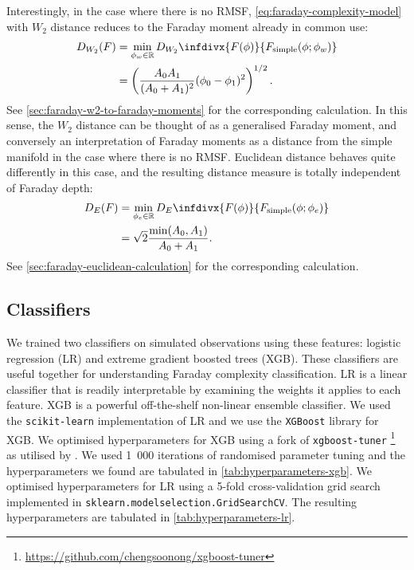     Interestingly, in the case where there is no RMSF, \autoref{eq:faraday-complexity-model} with $W_2$ distance reduces to the Faraday moment already in common use:
    \begin{align}
        D_{W_2}(F) &= \min_{\phi_w \in \mathbb{R}} D_{W_2}\infdivx{F(\phi)}{F_{\mathrm{simple}}(\phi; \phi_w)}\label{eq:faraday-W2-distance}\\
            &= \left(\frac{A_0A_1}{(A_0 + A_1)^2} (\phi_0 - \phi_1)^2\right)^{1/2}.
    \end{align}
    See \autoref{sec:faraday-w2-to-faraday-moments} for the corresponding calculation. In this sense, the $W_2$ distance can be thought of as a generalised Faraday moment, and conversely an interpretation of Faraday moments as a distance from the simple manifold in the case where there is no RMSF. Euclidean distance behaves quite differently in this case, and the resulting distance measure is totally independent of Faraday depth:
    \begin{align}
        D_{E}(F) &= \min_{\phi_e \in \mathbb{R}} D_E\infdivx{F(\phi)}{F_{\mathrm{simple}}(\phi; \phi_e)}\label{eq:faraday-Euclidean-distance}\\
            &= \sqrt{2} \frac{\min(A_0, A_1)}{A_0 + A_1}.
    \end{align}
    See \autoref{sec:faraday-euclidean-calculation} for the corresponding calculation.


  \subsection{Classifiers}
  \label{sec:faraday-classifiers}

    We trained two classifiers on simulated observations using these features: logistic regression (LR) and extreme gradient boosted trees (XGB). These classifiers are useful together for understanding Faraday complexity classification. LR is a linear classifier that is readily interpretable by examining the weights it applies to each feature. XGB is a powerful off-the-shelf non-linear ensemble classifier. We used the \texttt{scikit-learn} implementation of LR and we use the \texttt{XGBoost} library for XGB. We optimised hyperparameters for XGB using a fork of \texttt{xgboost-tuner} \footnote{\url{https://github.com/chengsoonong/xgboost-tuner}} as utilised by \citet{zhu20mutagenic}. We used 1~000 iterations of randomised parameter tuning and the hyperparameters we found are tabulated in \autoref{tab:hyperparameters-xgb}. We optimised hyperparameters for LR using a 5-fold cross-validation grid search implemented in \texttt{sklearn.model\textunderscore{}selection.GridSearchCV}. The resulting hyperparameters are tabulated in \autoref{tab:hyperparameters-lr}.

